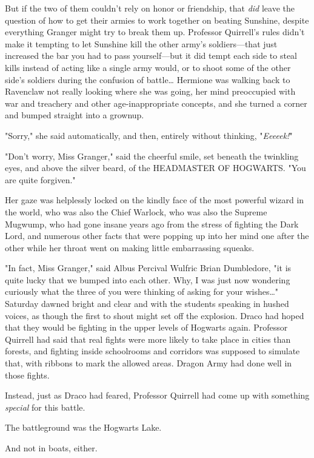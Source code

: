 But if the two of them couldn't rely on honor or friendship, that \emph{did} 
leave the question of how to get their armies to work together on beating 
Sunshine, despite everything Granger might try to break them up. Professor 
Quirrell's rules didn't make it tempting to let Sunshine kill the other army's 
soldiers---that just increased the bar you had to pass yourself---but it did 
tempt each side to steal kills instead of acting like a single army would, or 
to shoot some of the other side's soldiers during the confusion of 
battle{\ldots}
\sbreak
Hermione was walking back to Ravenclaw not really looking where she was going, 
her mind preoccupied with war and treachery and other age-inappropriate 
concepts, and she turned a corner and bumped straight into a grownup.

"Sorry," she said automatically, and then, entirely without thinking, 
"\emph{Eeeeek!}"

"Don't worry, Miss Granger," said the cheerful smile, set beneath the twinkling 
eyes, and above the silver beard, of the HEADMASTER OF HOGWARTS. "You are quite 
forgiven."

Her gaze was helplessly locked on the kindly face of the most powerful wizard 
in the world, who was also the Chief Warlock, who was also the Supreme Mugwump, 
who had gone insane years ago from the stress of fighting the Dark Lord, and 
numerous other facts that were popping up into her mind one after the other 
while her throat went on making little embarrassing squeaks.

"In fact, Miss Granger," said Albus Percival Wulfric Brian Dumbledore, "it is 
quite lucky that we bumped into each other. Why, I was just now wondering 
curiously what the three of you were thinking of asking for your wishes{\ldots}"
\sbreak
Saturday dawned bright and clear and with the students speaking in hushed 
voices, as though the first to shout might set off the explosion.
\sbreak
Draco had hoped that they would be fighting in the upper levels of Hogwarts 
again. Professor Quirrell had said that real fights were more likely to take 
place in cities than forests, and fighting inside schoolrooms and corridors was 
supposed to simulate that, with ribbons to mark the allowed areas. Dragon Army 
had done well in those fights.

Instead, just as Draco had feared, Professor Quirrell had come up with 
something \emph{special} for this battle.

The battleground was the Hogwarts Lake.

And not in boats, either.

